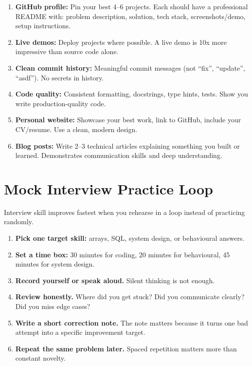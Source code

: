 \documentclass[12pt, a4paper, oneside]{book}
\begin{document}
\begin{enumerate}[leftmargin=2em]
    \item \textbf{GitHub profile:} Pin your best 4--6 projects. Each should have a professional README with: problem description, solution, tech stack, screenshots/demo, setup instructions.
    \item \textbf{Live demos:} Deploy projects where possible. A live demo is 10x more impressive than source code alone.
    \item \textbf{Clean commit history:} Meaningful commit messages (not ``fix'', ``update'', ``asdf''). No secrets in history.
    \item \textbf{Code quality:} Consistent formatting, docstrings, type hints, tests. Show you write production-quality code.
    \item \textbf{Personal website:} Showcase your best work, link to GitHub, include your CV/resume. Use a clean, modern design.
    \item \textbf{Blog posts:} Write 2--3 technical articles explaining something you built or learned. Demonstrates communication skills and deep understanding.
\end{enumerate}

\section{Mock Interview Practice Loop}

Interview skill improves fastest when you rehearse in a loop instead of practicing randomly.

\begin{enumerate}[leftmargin=2em]
    \item \textbf{Pick one target skill:} arrays, SQL, system design, or behavioural answers.
    \item \textbf{Set a time box:} 30 minutes for coding, 20 minutes for behavioural, 45 minutes for system design.
    \item \textbf{Record yourself or speak aloud.} Silent thinking is not enough.
    \item \textbf{Review honestly.} Where did you get stuck? Did you communicate clearly? Did you miss edge cases?
    \item \textbf{Write a short correction note.} The note matters because it turns one bad attempt into a specific improvement target.
    \item \textbf{Repeat the same problem later.} Spaced repetition matters more than constant novelty.
\end{enumerate}
\end{document}
